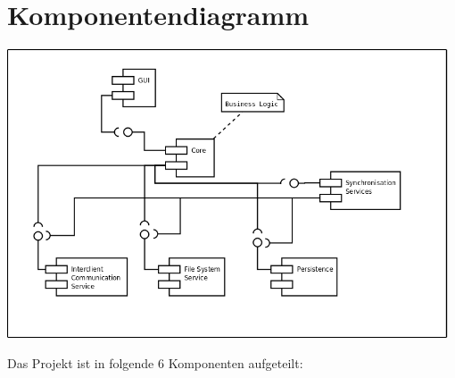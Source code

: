 \section{Komponentendiagramm}

\includegraphics[width=0.98\textwidth]{../uml/component_diagram.png}

Das Projekt ist in folgende 6 Komponenten aufgeteilt:





